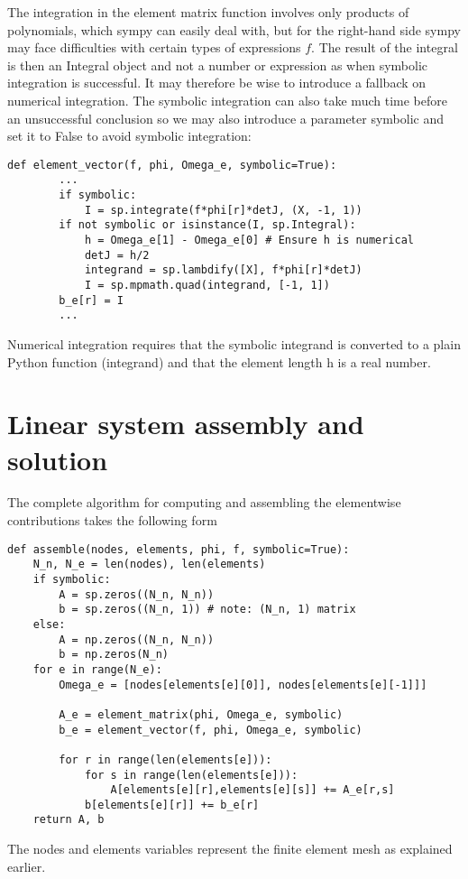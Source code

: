 \documentclass[../main.tex]{subfiles}
\begin{document}
The integration in the element matrix function involves only products of polynomials, which sympy can easily deal with, but for the right-hand side sympy may face difficulties with certain types of expressions $f$. The result of the integral is then an Integral object and not a number or expression as when symbolic integration is successful. It may therefore be wise to introduce a fallback on numerical integration. The symbolic integration can also take much time before an unsuccessful conclusion so we may also introduce a parameter symbolic and set it to False to avoid symbolic integration:
\begin{lstlisting}[numbers=none]
def element_vector(f, phi, Omega_e, symbolic=True):
		...
		if symbolic:
			I = sp.integrate(f*phi[r]*detJ, (X, -1, 1))
		if not symbolic or isinstance(I, sp.Integral):
			h = Omega_e[1] - Omega_e[0] # Ensure h is numerical
			detJ = h/2
			integrand = sp.lambdify([X], f*phi[r]*detJ)
			I = sp.mpmath.quad(integrand, [-1, 1])
		b_e[r] = I
		...
\end{lstlisting}
Numerical integration requires that the symbolic integrand is converted to a plain
Python function (integrand) and that the element length h is a real number.
\section[Linear system assembly and solution]{Linear system assembly and solution}
\label{sec:sec_4_2}
The complete algorithm for computing and assembling the elementwise contributions takes the following form
\begin{lstlisting}[numbers=none]
def assemble(nodes, elements, phi, f, symbolic=True):
	N_n, N_e = len(nodes), len(elements)
	if symbolic:
		A = sp.zeros((N_n, N_n))
		b = sp.zeros((N_n, 1)) # note: (N_n, 1) matrix
	else:
		A = np.zeros((N_n, N_n))
		b = np.zeros(N_n)
	for e in range(N_e):
		Omega_e = [nodes[elements[e][0]], nodes[elements[e][-1]]]
		
		A_e = element_matrix(phi, Omega_e, symbolic)
		b_e = element_vector(f, phi, Omega_e, symbolic)
		
		for r in range(len(elements[e])):
			for s in range(len(elements[e])):
				A[elements[e][r],elements[e][s]] += A_e[r,s]
			b[elements[e][r]] += b_e[r]
	return A, b	
\end{lstlisting}
The nodes and elements variables represent the finite element mesh as explained earlier.
\end{document}
